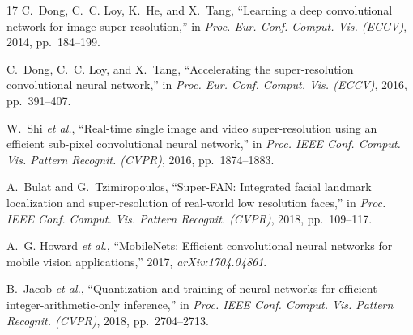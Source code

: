 \documentclass{IEEE_lsens}
\begin{document}
\begin{thebibliography}{17}
C.~Dong, C.~C. Loy, K.~He, and X.~Tang, ``Learning a deep convolutional network
for image super-resolution,'' in \emph{Proc. Eur. Conf. Comput. Vis. (ECCV)},
2014, pp.~184--199.

C.~Dong, C.~C. Loy, and X.~Tang, ``Accelerating the super-resolution
convolutional neural network,'' in \emph{Proc. Eur. Conf. Comput. Vis.
(ECCV)}, 2016, pp.~391--407.

W.~Shi \textit{et al.}, ``Real-time single image and video super-resolution
using an efficient sub-pixel convolutional neural network,'' in \emph{Proc.
IEEE Conf. Comput. Vis. Pattern Recognit. (CVPR)}, 2016, pp.~1874--1883.

A.~Bulat and G.~Tzimiropoulos, ``Super-FAN: Integrated facial landmark
localization and super-resolution of real-world low resolution faces,'' in
\emph{Proc. IEEE Conf. Comput. Vis. Pattern Recognit. (CVPR)}, 2018,
pp.~109--117.

A.~G. Howard \textit{et al.}, ``MobileNets: Efficient convolutional neural
networks for mobile vision applications,'' 2017, \emph{arXiv:1704.04861}.

B.~Jacob \textit{et al.}, ``Quantization and training of neural networks for
efficient integer-arithmetic-only inference,'' in \emph{Proc. IEEE Conf.
Comput. Vis. Pattern Recognit. (CVPR)}, 2018, pp.~2704--2713.

\end{thebibliography}
\end{document}
